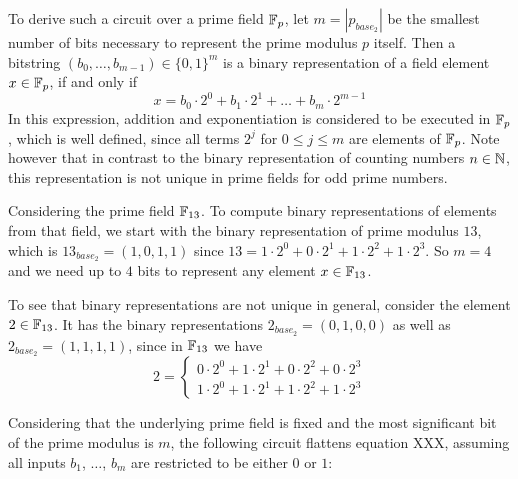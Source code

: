 To derive such a circuit over a prime field $\mathbb{F}_p$, let $m=|p_{base_2}|$ be the smallest number of bits necessary to represent the prime modulus $p$ itself. Then a bitstring $(b_0,\ldots,b_{m-1})\in \{0,1\}^m$ is a binary representation of a field element $x\in\mathbb{F}_p$, if and only if
$$
x = b_0\cdot 2^0 + b_1\cdot 2^1 + \ldots + b_m\cdot 2^{m-1}
$$ 
In this expression, addition and exponentiation is considered to be executed in $\mathbb{F}_p$, which is well defined, since all terms $2^j$ for $0\leq j \leq m$ are elements of $\mathbb{F}_p$. Note however that in contrast to the binary representation of counting numbers $n\in\mathbb{N}$, this representation is not unique in prime fields for odd prime numbers. 
\begin{example} Considering the prime field $\mathbb{F}_{13}$. To compute binary representations of elements from that field, we start with the binary representation of prime modulus $13$, which is $13_{base_2} = (1,0,1,1)$ since 
$13= 1\cdot 2^0 + 0\cdot 2^1 + 1\cdot 2^2 + 1\cdot 2^3$. So $m=4$ and we need up to $4$ bits to represent any element $x\in\mathbb{F}_{13}$.

To see that binary representations are not unique in general, consider the element $2\in \mathbb{F}_{13}$. It has the binary representations $2_{base_2}=(0,1,0,0)$ as well as $2_{base_2}=(1,1,1,1)$, since in $\mathbb{F}_{13}$ we have
$$
2 = \begin{cases}
0\cdot 2^0 + 1\cdot 2^1 + 0\cdot 2^2 + 0\cdot 2^3\\
1\cdot 2^0 + 1\cdot 2^1 + 1\cdot 2^2 + 1\cdot 2^3
\end{cases}
$$
\end{example}
Considering that the underlying prime field is fixed and the most significant bit of the prime modulus is $m$, the following circuit flattens equation XXX, assuming all inputs $b_1$, $\ldots$, $b_m$ are restricted to be either $0$ or $1$:
